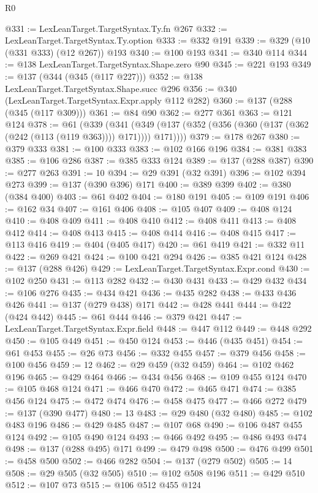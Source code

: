 \begin{lexlean}{R0}
\begin{coremodule}
{{{{{{{{{{{{{{{{{{{{{{{{{{{{{{{{{{{{{{{{{{{{{{{{{{{{{{{{{{{{{{{{{{{{{{{{{{{{{{{{{{{{{{@331 := LexLeanTarget.TargetSyntax.Ty.fn @267
@332 := LexLeanTarget.TargetSyntax.Ty.option
@333 := @332 @191
@339 := @329 (@10 (@331 @333) (@12 @267)) @193
@340 := @100 @193
@341 := @340 @114
@344 := @138 LexLeanTarget.TargetSyntax.Shape.zero @90
@345 := @221 @193
@349 := @137 (@344 (@345 (@117 @227)))
@352 := @138 LexLeanTarget.TargetSyntax.Shape.succ @296
@356 := @340 (LexLeanTarget.TargetSyntax.Expr.apply @112 @282)
@360 := @137 (@288 (@345 (@117 @309)))
@361 := @84 @90
@362 := @277 @361
@363 := @121 @124
@378 := @61
    (@339
      (@341 (@349 (@137 (@352 (@356 (@360 (@137 (@362 (@242 (@113 (@119 @363)))) @171)))) @171))))
@379 := @178 @267
@380 := @379 @333
@381 := @100 @333
@383 := @102 @166 @196
@384 := @381 @383
@385 := @106 @286
@387 := @385 @333 @124
@389 := @137 (@288 @387)
@390 := @277 @263
@391 := 10
@394 := @29 @391 (@32 @391)
@396 := @102 @394 @273
@399 := @137 (@390 @396) @171
@400 := @389 @399
@402 := @380 (@384 @400)
@403 := @61 @402
@404 := @180 @191
@405 := @109 @191
@406 := @162 @34
@407 := @161 @406
@408 := @105 @407
@409 := @408 @124
@410 := @408 @409
@411 := @408 @410
@412 := @408 @411
@413 := @408 @412
@414 := @408 @413
@415 := @408 @414
@416 := @408 @415
@417 := @113 @416
@419 := @404 (@405 @417)
@420 := @61 @419
@421 := @332 @11
@422 := @269 @421
@424 := @100 @421 @294
@426 := @385 @421 @124
@428 := @137 (@288 @426)
@429 := LexLeanTarget.TargetSyntax.Expr.cond
@430 := @102 @250
@431 := @113 @282
@432 := @430 @431
@433 := @429 @432
@434 := @106 @276
@435 := @434 @421
@436 := @435 @282
@438 := @433 @436 @426
@441 := @137 (@279 @438) @171
@442 := @428 @441
@444 := @422 (@424 @442)
@445 := @61 @444
@446 := @379 @421
@447 := LexLeanTarget.TargetSyntax.Expr.field
@448 := @447 @112
@449 := @448 @292
@450 := @105 @449
@451 := @450 @124
@453 := @446 (@435 @451)
@454 := @61 @453
@455 := @26 @73
@456 := @332 @455
@457 := @379 @456
@458 := @100 @456
@459 := 12
@462 := @29 @459 (@32 @459)
@464 := @102 @462 @196
@465 := @429 @464
@466 := @434 @456
@468 := @109 @455 @124
@470 := @105 @468 @124
@471 := @466 @470
@472 := @465 @471
@474 := @385 @456 @124
@475 := @472 @474
@476 := @458 @475
@477 := @466 @272
@479 := @137 (@390 @477)
@480 := 13
@483 := @29 @480 (@32 @480)
@485 := @102 @483 @196
@486 := @429 @485
@487 := @107 @68
@490 := @106 @487 @455 @124
@492 := @105 @490 @124
@493 := @466 @492
@495 := @486 @493 @474
@498 := @137 (@288 @495) @171
@499 := @479 @498
@500 := @476 @499
@501 := @458 @500
@502 := @466 @282
@504 := @137 (@279 @502)
@505 := 14
@508 := @29 @505 (@32 @505)
@510 := @102 @508 @196
@511 := @429 @510
@512 := @107 @73
@515 := @106 @512 @455 @124
}}}}}}}}}}}}}}}}}}}}}}}}}}}}}}}}}}}}}}}}}}}}}}}}}}}}}}}}}}}}}}}}}}}}}}}}}}}}}}}}}}}}}}
\end{coremodule}
\end{lexlean}
